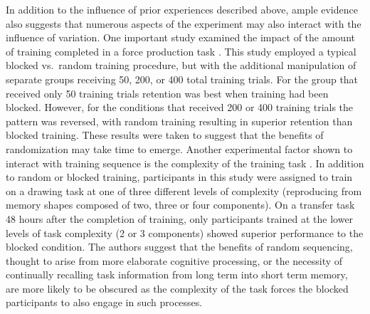 \documentclass[
  12pt,
  letterpaper,
]{article}
\begin{document}
In addition to the influence of prior experiences described above, ample
evidence also suggests that numerous aspects of the experiment may also
interact with the influence of variation. One important study examined
the impact of the amount of training completed in a force production
task \autocite{sheaContextualInterferenceContributions1990}. This study
employed a typical blocked vs.~random training procedure, but with the
additional manipulation of separate groups receiving 50, 200, or 400
total training trials. For the group that received only 50 training
trials retention was best when training had been blocked. However, for
the conditions that received 200 or 400 training trials the pattern was
reversed, with random training resulting in superior retention than
blocked training. These results were taken to suggest that the benefits
of randomization may take time to emerge. Another experimental factor
shown to interact with training sequence is the complexity of the
training task \autocite{albaretDifferentialEffectsTask1998}. In addition
to random or blocked training, participants in this study were assigned
to train on a drawing task at one of three different levels of
complexity (reproducing from memory shapes composed of two, three or
four components). On a transfer task 48 hours after the completion of
training, only participants trained at the lower levels of task
complexity (2 or 3 components) showed superior performance to the
blocked condition. The authors suggest that the benefits of random
sequencing, thought to arise from more elaborate cognitive processing,
or the necessity of continually recalling task information from long
term into short term memory, are more likely to be obscured as the
complexity of the task forces the blocked participants to also engage in
such processes.
\end{document}
